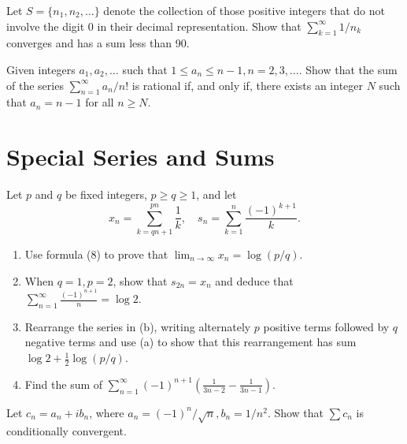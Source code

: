 \begin{problembox}
Let \(S = \{n_1, n_2, \ldots\}\) denote the collection of those positive integers that do not involve the digit 0 in their decimal representation. Show that \(\sum_{k=1}^{\infty} 1/n_k\) converges and has a sum less than 90.
\end{problembox}



\begin{problembox}
Given integers \(a_1, a_2, \ldots\) such that \(1 \leq a_n \leq n - 1, n = 2, 3, \ldots\). Show that the sum of the series \(\sum_{n=1}^{\infty} a_n / n!\) is rational if, and only if, there exists an integer \(N\) such that \(a_n = n - 1\) for all \(n \geq N\).
\end{problembox}

\section{Special Series and Sums}



\begin{problembox}
Let \(p\) and \(q\) be fixed integers, \(p \geq q \geq 1\), and let
\[x_n = \sum_{k=qn+1}^{pn} \frac{1}{k}, \quad s_n = \sum_{k=1}^{n} \frac{(-1)^{k+1}}{k}.\]
\begin{enumerate}[label=\alph*)]
\item Use formula (8) to prove that \(\lim_{n \to \infty} x_n = \log(p/q)\).
\item When \(q = 1, p = 2\), show that \(s_{2n} = x_n\) and deduce that \(\sum_{n=1}^{\infty} \frac{(-1)^{n+1}}{n} = \log 2\).
\item Rearrange the series in (b), writing alternately \(p\) positive terms followed by \(q\) negative terms and use (a) to show that this rearrangement has sum \(\log 2 + \frac{1}{2} \log(p/q)\).
\item Find the sum of \(\sum_{n=1}^{\infty} (-1)^{n+1} \left( \frac{1}{3n - 2} - \frac{1}{3n - 1} \right)\).
\end{enumerate}
\end{problembox}



\begin{problembox}
Let \(c_n = a_n + ib_n\), where \(a_n = (-1)^n/\sqrt{n}, b_n = 1/n^2\). Show that \(\sum c_n\) is conditionally convergent.
\end{problembox}



